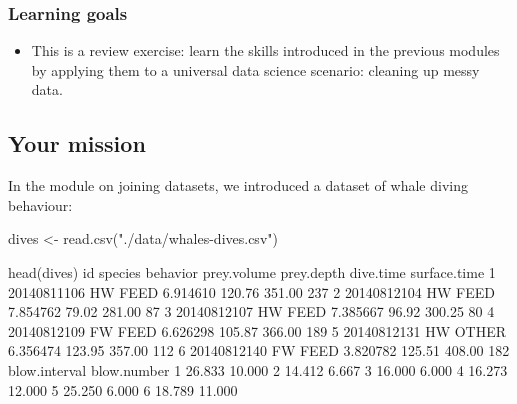 \documentclass[
]{book}
\newenvironment{Shaded}{\begin{snugshade}}{\end{snugshade}}
\newcommand{\DecValTok}[1]{\textcolor[rgb]{0.00,0.00,0.81}{#1}}
\newcommand{\FloatTok}[1]{\textcolor[rgb]{0.00,0.00,0.81}{#1}}
\newcommand{\FunctionTok}[1]{\textcolor[rgb]{0.00,0.00,0.00}{#1}}
\newcommand{\NormalTok}[1]{#1}
\newcommand{\OtherTok}[1]{\textcolor[rgb]{0.56,0.35,0.01}{#1}}
\newcommand{\StringTok}[1]{\textcolor[rgb]{0.31,0.60,0.02}{#1}}
\providecommand{\tightlist}{%
  \setlength{\itemsep}{0pt}\setlength{\parskip}{0pt}}
\begin{document}
\hypertarget{learning-goals-21}{%
\subsubsection*{Learning goals}\label{learning-goals-21}}

\begin{itemize}
\tightlist
\item
  This is a review exercise: learn the skills introduced in the previous modules by applying them to a universal data science scenario: cleaning up messy data.
\end{itemize}

\hypertarget{your-mission}{%
\subsection*{Your mission}\label{your-mission}}

In the module on joining datasets, we introduced a dataset of whale diving behaviour:

\begin{Shaded}
\begin{Highlighting}[]
\NormalTok{dives }\OtherTok{\textless{}{-}} \FunctionTok{read.csv}\NormalTok{(}\StringTok{"./data/whales{-}dives.csv"}\NormalTok{)}
\end{Highlighting}
\end{Shaded}

\begin{Shaded}
\begin{Highlighting}[]
\FunctionTok{head}\NormalTok{(dives)}
\NormalTok{           id species behavior prey.volume prey.depth dive.time surface.time}
\DecValTok{1} \DecValTok{20140811106}\NormalTok{      HW     FEED    }\FloatTok{6.914610}     \FloatTok{120.76}    \FloatTok{351.00}          \DecValTok{237}
\DecValTok{2} \DecValTok{20140812104}\NormalTok{      HW     FEED    }\FloatTok{7.854762}      \FloatTok{79.02}    \FloatTok{281.00}           \DecValTok{87}
\DecValTok{3} \DecValTok{20140812107}\NormalTok{      HW     FEED    }\FloatTok{7.385667}      \FloatTok{96.92}    \FloatTok{300.25}           \DecValTok{80}
\DecValTok{4} \DecValTok{20140812109}\NormalTok{      FW     FEED    }\FloatTok{6.626298}     \FloatTok{105.87}    \FloatTok{366.00}          \DecValTok{189}
\DecValTok{5} \DecValTok{20140812131}\NormalTok{      HW    OTHER    }\FloatTok{6.356474}     \FloatTok{123.95}    \FloatTok{357.00}          \DecValTok{112}
\DecValTok{6} \DecValTok{20140812140}\NormalTok{      FW     FEED    }\FloatTok{3.820782}     \FloatTok{125.51}    \FloatTok{408.00}          \DecValTok{182}
\NormalTok{  blow.interval blow.number}
\DecValTok{1}        \FloatTok{26.833}      \FloatTok{10.000}
\DecValTok{2}        \FloatTok{14.412}       \FloatTok{6.667}
\DecValTok{3}        \FloatTok{16.000}       \FloatTok{6.000}
\DecValTok{4}        \FloatTok{16.273}      \FloatTok{12.000}
\DecValTok{5}        \FloatTok{25.250}       \FloatTok{6.000}
\DecValTok{6}        \FloatTok{18.789}      \FloatTok{11.000}
\end{Highlighting}
\end{Shaded}
\end{document}
